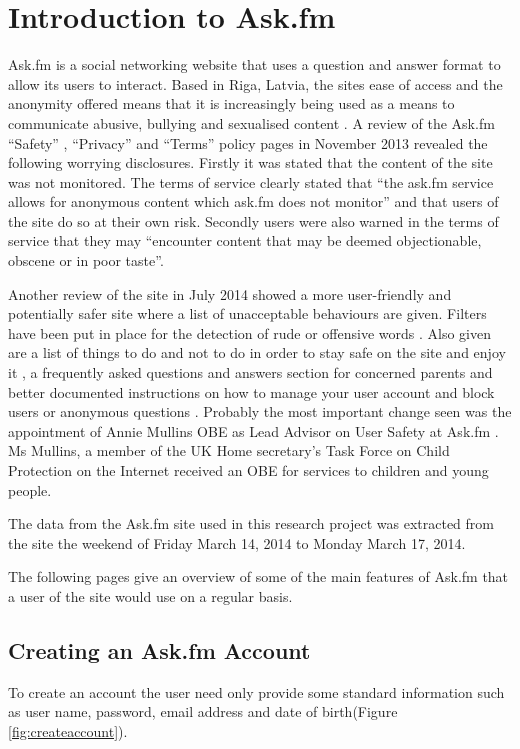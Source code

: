 \section{Introduction to Ask.fm}
\label{section:2.1}

Ask.fm is a social networking website that uses a question and answer format to allow its users to interact. Based in Riga, Latvia, the sites ease of access and the anonymity offered means that it is increasingly being used as a means to communicate abusive, bullying and sexualised content \cite{Webwise:2103}. A review of the Ask.fm ``Safety'' \cite{askfm_a:2014}, ``Privacy'' \cite{askfm_b:2014} and ``Terms'' \cite{askfm_c:2014} policy pages in November 2013 revealed the following worrying disclosures. Firstly it was stated that the content of the site was not monitored. The terms of service clearly stated that ``the ask.fm service allows for anonymous content which ask.fm does not monitor'' and that users of the site do so at their own risk. Secondly users were also warned in the terms of service that they may ``encounter content that may be deemed objectionable, obscene or in poor taste''.

Another review of the site in July 2014 showed a more user-friendly and potentially safer site where a list of unacceptable behaviours are given. Filters have been put in place for the detection of rude or offensive words \cite{askfm_d:2014}. Also given are a list of things to do and not to do in order to stay safe on the site and enjoy it \cite{askfm_e:2014}, a frequently asked questions and answers section for concerned parents \cite{askfm_f:2014} and better documented instructions on how to manage your user account and block users or anonymous questions \cite{askfm_g:2014}. Probably the most important change seen was the appointment of Annie Mullins OBE as Lead Advisor on User Safety at Ask.fm \cite{askfm_h:2014}. Ms Mullins, a member of the UK Home secretary's Task Force on Child Protection on the Internet received an OBE for services to children and young people.

The data from the Ask.fm site used in this research project was extracted from the site the weekend of Friday March 14, 2014 to Monday March 17, 2014.

The following pages give an overview of some of the main features of Ask.fm that a user of the site would use on a regular basis.

\subsection{Creating an Ask.fm Account}
To create an account the user need only provide some standard information such as user name, password, email address and date of birth(Figure \ref{fig:createaccount}).

